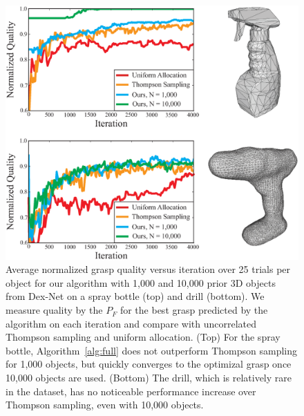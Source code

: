 \begin{figure}[t!]
\centering
\includegraphics[scale=0.31]{figures/illustrations/avg_reward_drill.eps}
\caption{Average normalized grasp quality versus iteration over 25 trials per object for our algorithm with 1,000 and 10,000 prior 3D objects from Dex-Net on a spray bottle (top) and drill (bottom). We measure quality by the $P_F$ for the best grasp predicted by the algorithm on each iteration and compare with uncorrelated Thompson sampling and uniform allocation. (Top) For the spray bottle, Algorithm~\ref{alg:full} does not outperform Thompson sampling for 1,000 objects, but quickly converges to the optimizal grasp once 10,000 objects are used. (Bottom) The drill, which is relatively rare in the dataset, has no noticeable performance increase over Thompson sampling, even with 10,000 objects.}
\vspace*{-15pt}
\end{figure}

